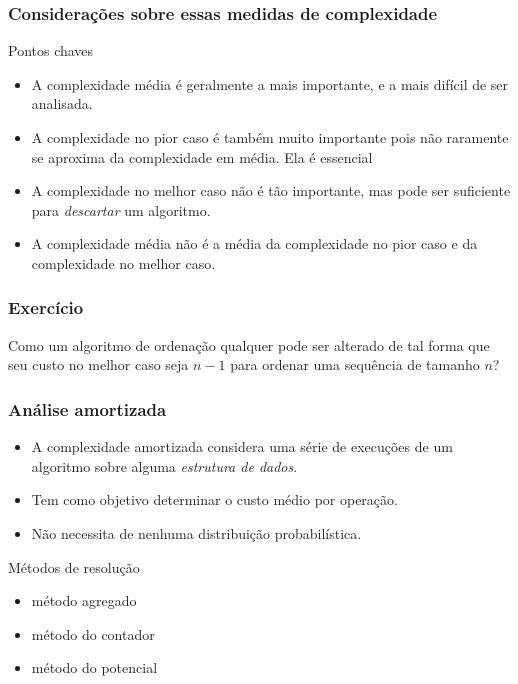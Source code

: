 \documentclass[handout]{beamer}
\begin{document}
\begin{frame}
\frametitle{Considerações sobre essas medidas de complexidade}

\begin{block}{Pontos chaves}
  \begin{itemize}
  \item A complexidade média é geralmente a mais importante, e a mais difícil
    de ser analisada.

  \item A complexidade no pior caso é também muito importante pois não raramente
    se aproxima da complexidade em média. Ela é essencial

  \item A complexidade no melhor caso não é tão importante, mas pode ser
    suficiente para \emph{descartar} um algoritmo.

  \item A complexidade média \alert{não} é a média da complexidade no pior caso
    e da complexidade no melhor caso.
  \end{itemize}
\end{block}

\end{frame}

\begin{frame}
\frametitle{Exercício}

Como um algoritmo de ordenação qualquer pode ser alterado de tal forma que seu
custo no melhor caso seja $n-1$ para ordenar uma sequência de tamanho $n$?

\end{frame}

\begin{frame}
\frametitle{Análise amortizada}

\begin{itemize}
\item A complexidade amortizada considera uma série de execuções de um algoritmo
sobre alguma \emph{estrutura de dados}.
\item Tem como objetivo determinar o custo médio por operação.
\item Não necessita de nenhuma distribuição probabilística.
\end{itemize}

\pause
Métodos de resolução
\begin{itemize}
\item método agregado 
\item método do contador
\item método do potencial
\end{itemize}

\end{frame}
\end{document}
